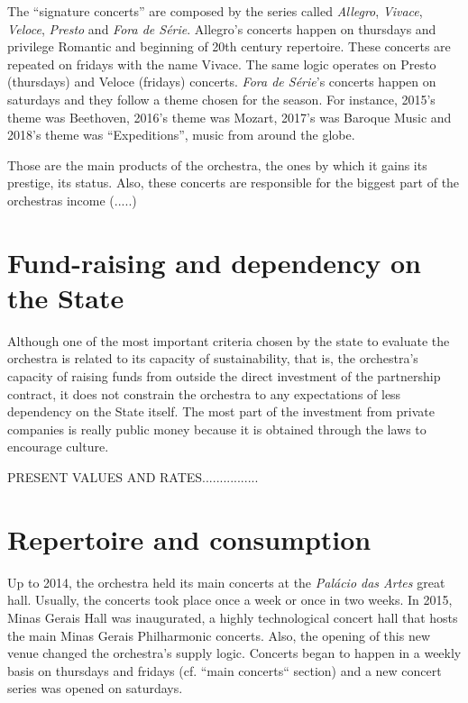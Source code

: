 \documentclass[a4paper, 12pt, openright, oneside, german, french, brazil, english]{abntex2}
\begin{document}
        The ``signature concerts'' are composed by the series called \textit{Allegro}, \textit{Vivace}, \textit{Veloce}, \textit{Presto} and \textit{Fora de Série}. Allegro's concerts happen on thursdays and privilege Romantic and beginning of 20th century repertoire. These concerts are repeated on fridays with the name Vivace. The same logic operates on Presto (thursdays) and Veloce (fridays) concerts. \textit{Fora de Série}'s concerts happen on saturdays and they follow a theme chosen for the season. For instance, 2015's theme was Beethoven, 2016's theme was Mozart, 2017's was Baroque Music and 2018's theme was ``Expeditions'', music from around the globe.

        Those are the main products of the orchestra, the ones by which it gains its prestige, its status. Also, these concerts are responsible for the biggest part of the orchestras income (.....) %

        

        \section{Fund-raising and dependency on the State}

        Although one of the most important criteria chosen by the state to evaluate the orchestra is related to its capacity of sustainability, that is, the orchestra's capacity of raising funds from outside the direct investment of the partnership contract, it does not constrain the orchestra to any expectations of less dependency on the State itself. The most part of the investment from private companies is really public money because it is obtained through the laws to encourage culture.

        PRESENT VALUES AND RATES................


        \section{Repertoire and consumption}

        Up to 2014, the orchestra held its main concerts at the \textit{Palácio das Artes} great hall. Usually, the concerts took place once a week or once in two weeks. In 2015, Minas Gerais Hall was inaugurated, a highly technological concert hall that hosts the main Minas Gerais Philharmonic concerts. Also, the opening of this new venue changed the orchestra's supply logic. Concerts began to happen in a weekly basis on thursdays and fridays (cf. ``main concerts`` section) and a new concert series was opened on saturdays.
\end{document}
